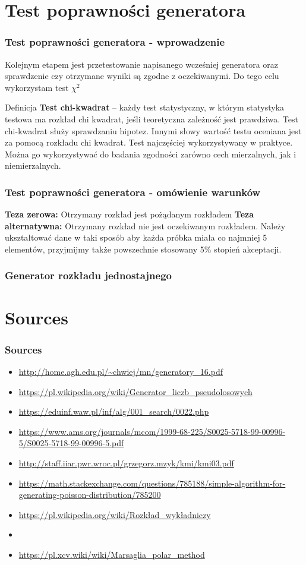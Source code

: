 \documentclass[9pt]{beamer}
\begin{document}
\section{Test poprawności generatora}
\begin{frame}
  \frametitle{Test poprawności generatora - wprowadzenie}
  Kolejnym etapem jest przetestowanie napisanego wcześniej generatora oraz sprawdzenie czy otrzymane wyniki są zgodne z oczekiwanymi. Do tego celu wykorzystam test $\chi^2$
  \begin{block}{Definicja}
    \textbf{Test chi-kwadrat} – każdy test statystyczny, w którym statystyka testowa ma rozkład chi kwadrat, jeśli teoretyczna zależność jest prawdziwa. Test chi-kwadrat służy sprawdzaniu hipotez. Innymi słowy wartość testu oceniana jest za pomocą rozkładu chi kwadrat. Test najczęściej wykorzystywany w praktyce. Można go wykorzystywać do badania zgodności zarówno cech mierzalnych, jak i niemierzalnych.
    \end{block}
\end{frame}
\begin{frame}
  \frametitle{Test poprawności generatora - omówienie warunków}
  \textbf{Teza zerowa:} Otrzymany rozkład jest pożądanym rozkładem \newline
  \textbf{Teza alternatywna:} Otrzymany rozkład nie jest oczekiwanym rozkładem. \newline
  Należy ukształtować dane w taki sposób aby każda próbka miała co najmniej 5 elementów, przyjmijmy także powszechnie stosowany 5\% stopień akceptacji.
\end{frame}
\begin{frame}
  \frametitle{Generator rozkładu jednostajnego}
  
\end{frame}
\section{Sources}
\begin{frame}
  \frametitle{Sources}
  \begin{itemize}
    \item \url{http://home.agh.edu.pl/~chwiej/mn/generatory_16.pdf}
    \item \url{https://pl.wikipedia.org/wiki/Generator_liczb_pseudolosowych}
    \item \url{https://eduinf.waw.pl/inf/alg/001_search/0022.php}
    \item \url{https://www.ams.org/journals/mcom/1999-68-225/S0025-5718-99-00996-5/S0025-5718-99-00996-5.pdf}
    \item \url{http://staff.iiar.pwr.wroc.pl/grzegorz.mzyk/kmi/kmi03.pdf}
    \item \url{https://math.stackexchange.com/questions/785188/simple-algorithm-for-generating-poisson-distribution/785200}
    \item \url{https://pl.wikipedia.org/wiki/Rozkład_wykładniczy}
    \item \item \url{https://pl.xcv.wiki/wiki/Marsaglia_polar_method}
  \end{itemize}
\end{frame}
\end{document}
